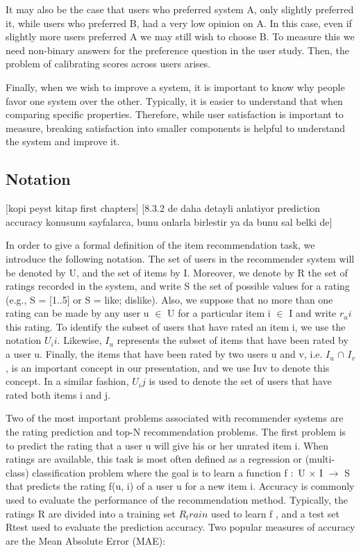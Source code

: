 It may also be the case that users who preferred system A, only slightly preferred it, while users who preferred B, had a very low opinion on A. In this case, even if slightly more users preferred A we may still wish to choose B. To measure this we need non-binary answers for the preference question in the user study. Then, the problem of calibrating scores across users arises.

Finally, when we wish to improve a system, it is important to know why people favor one system over the other. Typically, it is easier to understand that when comparing specific properties. Therefore, while user satisfaction is important to measure, breaking satisfaction into smaller components is helpful to understand the system and improve it.

\subsection{Notation}
[kopi peyst kitap first chapters]
[8.3.2 de daha detayli anlatiyor prediction accuracy konusunu sayfalarca, bunu onlarla birlestir ya da bunu sal belki de]

In order to give a formal definition of the item recommendation task, we introduce the following notation. The set of users in the recommender system will be denoted by U, and the set of items by I. Moreover, we denote by R the set of ratings recorded in the system, and write S the set of possible values for a rating (e.g., S = [1..5] or S = {like; dislike}). Also, we suppose that no more than one rating can be made by any user u $\in$  U for a particular item i $\in$ I and write $r_ui$ this rating. To identify the subset of users that have rated an item i, we use the notation $U_ii$. Likewise, $I_u$ represents the subset of items that have been rated by a user u. Finally, the items that have been rated by two users u and v, i.e. $I_u$ $\cap$ $I_v$, is an important concept in our presentation, and we use Iuv to denote this concept. In a similar fashion, $U_ij$ is used to denote the set of users that have rated both items i and j.

Two of the most important problems associated with recommender systems are the rating prediction and top-N recommendation problems. The first problem is to predict the rating that a user u will give his or her unrated item i. When ratings are available, this task is most often defined as a regression or (multi-class) classification problem where the goal is to learn a function f $\colon$ U $\times$ I $\rightarrow$ S that predicts the rating f(u, i) of a user u for a new item i. Accuracy is commonly used to evaluate the performance of the recommendation method. Typically, the ratings R are divided into a training set $R_train$ used to learn f , and a test set Rtest used to evaluate the prediction accuracy. Two popular measures of accuracy are the Mean Absolute Error (MAE):

